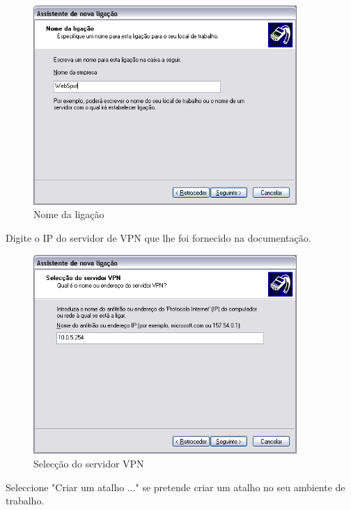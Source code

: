 \begin{figure}[H]
    \begin{center}
        \includegraphics[width=10cm]{include/img/xp_f5}
    \end{center}
    \caption{Nome da ligação}
    \label{fig:XPF5}
\end{figure}

Digite o IP do servidor de  VPN que lhe foi fornecido na documentação.

\begin{figure}[H]
    \begin{center}
        \includegraphics[width=10cm]{include/img/xp_f6}
    \end{center}
    \caption{Selecção do servidor VPN}
    \label{fig:XPF6}
\end{figure}

Seleccione "Criar um atalho ..." se pretende criar um atalho no seu ambiente de trabalho.

